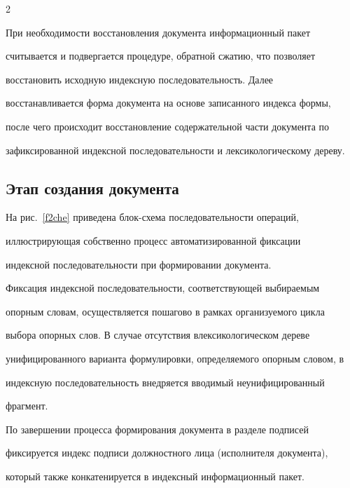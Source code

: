 \begin{multicols}{2}
     


     При необходимости восстановления документа информационный пакет 


считывается и подвергается процедуре, обратной сжатию, что позволяет 


восстановить исходную индексную последовательность. Далее 


восстанавливается форма документа на основе записанного индекса формы, 


после чего происходит восстановление содержательной части документа по 


зафиксированной индексной последовательности и лексикологическому дереву.


     


     \subsection*{Этап создания документа}


     


     На рис.~\ref{f2che} приведена блок-схема последовательности операций, 


иллюстрирующая собственно процесс автоматизированной фиксации 


индексной последовательности при формировании документа.


     


     Фиксация индексной последовательности, соответствующей выбираемым 


опорным словам, осуществляется пошагово в рамках организуемого цик\-ла 


выбора опорных слов. В случае отсутствия в\linebreak лексикологическом дереве 


унифицированного варианта формулировки, определяемого опорным словом, в 


индексную последовательность внедряется вводимый неунифицированный 


фрагмент.


     


     По завершении процесса формирования документа в разделе подписей 


фиксируется индекс подписи должностного лица (исполнителя документа), 


который также конкатенируется в индексный информационный пакет.


\end{multicols}





